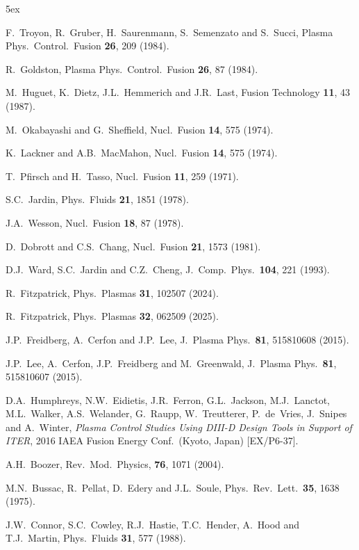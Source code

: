 \documentclass[12pt,prb,aps]{revtex4-1}
\begin{document}
\begin{thebibliography}{99}\baselineskip 5ex

   F.~Troyon, R.~Gruber, H.~Saurenmann, S.~Semenzato and S.~Succi, Plasma Phys.\ Control.\ Fusion {\bf 26}, 209 (1984). 

 R.~Goldston, Plasma Phys.\ Control.\ Fusion {\bf 26}, 87 (1984).

 M.~Huguet, K.~Dietz,  J.L.~Hemmerich and J.R.~Last, Fusion Technology  {\bf 11}, 43 (1987).

 M.~Okabayashi and G.~Sheffield, Nucl.\ Fusion {\bf 14}, 575 (1974). 

 K.~Lackner and A.B.~MacMahon, Nucl.\ Fusion {\bf 14}, 575 (1974). 

 T.~Pfirsch and H.~Tasso, Nucl.\ Fusion {\bf 11}, 259 (1971).

 S.C.~Jardin, Phys.\ Fluids {\bf 21}, 1851 (1978). 

 J.A.~Wesson, Nucl.\ Fusion {\bf 18}, 87 (1978).

 D.~Dobrott and C.S.~Chang, Nucl.\ Fusion {\bf 21}, 1573 (1981).

 D.J.~Ward, S.C.~Jardin and C.Z.~Cheng, J.\ Comp.\ Phys.\ {\bf 104}, 221 (1993).

 R.~Fitzpatrick, Phys.\ Plasmas {\bf 31}, 102507 (2024).

 R.~Fitzpatrick, Phys.\ Plasmas {\bf 32}, 062509 (2025).

 J.P.~Freidberg, A.~Cerfon and J.P.~Lee, J.\ Plasma Phys.\ {\bf 81}, 515810608 (2015).

 J.P.~Lee, A.~Cerfon, J.P.~Freidberg and M.~Greenwald, J.\ Plasma Phys.\ {\bf 81}, 515810607 (2015).

 D.A.~Humphreys, N.W.~Eidietis, J.R.~Ferron, G.L.~Jackson, M.J.~Lanctot, M.L.~Walker, 
A.S.~Welander, G.~Raupp, W.~Treutterer, P.~de~Vries, J.~Snipes and A.~Winter, {\em Plasma Control Studies
Using DIII-D Design Tools in Support of ITER}, 2016 IAEA Fusion Energy Conf.\ (Kyoto, Japan) [EX/P6-37].

 A.H.~Boozer, Rev.\ Mod.\ Physics, {\bf 76}, 1071 (2004). 

 M.N.~Bussac, R.~Pellat, D.~Edery and J.L.~Soule, Phys.\ Rev.\ Lett.\ {\bf 35}, 1638 (1975).

 J.W.~Connor,  S.C.~Cowley, R.J.~Hastie,  T.C.~Hender,  A.~Hood  and T.J.~Martin,  Phys.\ Fluids {\bf 31}, 577 (1988).


\end{thebibliography}
\end{document}
